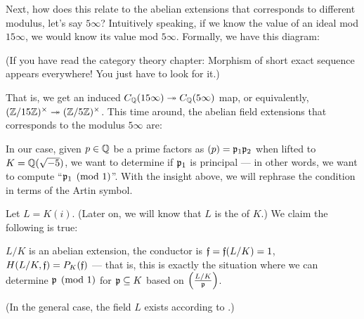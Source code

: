 \begin{example}
	Next, how does this relate to the abelian extensions that corresponds to different modulus,
	let's say $5 \infty$?
	Intuitively speaking, if we know the value of an ideal mod $15 \infty$, we would know its
	value mod $5 \infty$. Formally, we have this diagram:
	\begin{center}
	\end{center}
	(If you have read the category theory chapter:
	Morphism of short exact sequence appears everywhere! You just have to look for it.)

	That is, we get an induced $C_\mathbb Q(15 \infty) \twoheadrightarrow C_\mathbb Q(5 \infty)$ map,
	or equivalently, $(\mathbb Z/15\mathbb Z)^\times \twoheadrightarrow (\mathbb Z/5\mathbb Z)^\times$.
	This time around, the abelian field extensions that corresponds to the modulus $5 \infty$ are:
	\begin{center}
	\end{center}
\end{example}

In our case, given $p \in \mathbb Q$ be a prime factors as $(p) = \mathfrak p_1 \mathfrak p_2$ when lifted to
$K = \mathbb Q(\sqrt{-5})$, we want to determine if $\mathfrak p_1$ is principal --- in other words, we want to
compute ``$\mathfrak p_1 \pmod{1}$''.
With the insight above, we will rephrase the condition in terms of the Artin symbol.

Let $L = K(i)$. (Later on, we will know that $L$ is the  of $K$.)
We claim the following is true:
\begin{itemize}
	\ii $L/K$ is an abelian extension,
	\ii the conductor is $\mathfrak f = \mathfrak f(L/K) = 1$,
	\ii $H(L/K, \mathfrak f) = P_K(\mathfrak f)$ --- that is, this is exactly the situation where we can determine
	$\mathfrak p \pmod{1}$ for $\mathfrak p \subseteq K$ based on $\left(\frac{L/K}{\mathfrak p}\right)$.
\end{itemize}

(In the general case, the field $L$ exists according to .)

